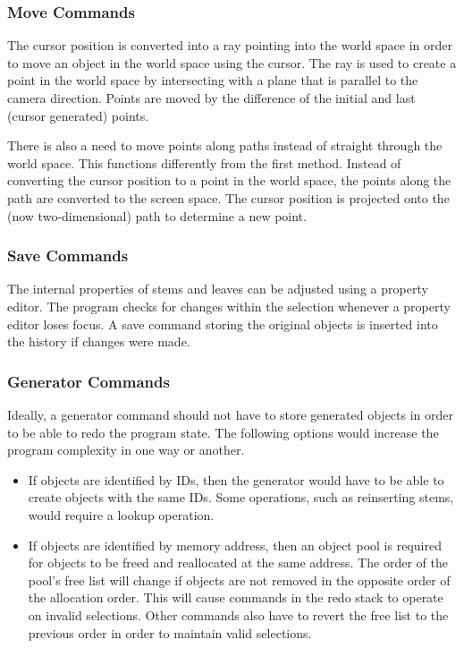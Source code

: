 \documentclass[10pt]{article}
\begin{document}
\subsubsection{Move Commands}

The cursor position is converted into a ray pointing into the world space in order to move an object in the world space using the cursor. The ray is used to create a point in the world space by intersecting with a plane that is parallel to the camera direction. Points are moved by the difference of the initial and last (cursor generated) points.

There is also a need to move points along paths instead of straight through the world space. This functions differently from the first method. Instead of converting the cursor position to a point in the world space, the points along the path are converted to the screen space. The cursor position is projected onto the (now two-dimensional) path to determine a new point.

\subsubsection{Save Commands}

The internal properties of stems and leaves can be adjusted using a property editor. The program checks for changes within the selection whenever a property editor loses focus. A save command storing the original objects is inserted into the history if changes were made.

\subsubsection{Generator Commands}

Ideally, a generator command should not have to store generated objects in order to be able to redo the program state. The following options would increase the program complexity in one way or another.

\begin{itemize}
\item If objects are identified by IDs, then the generator would have to be able to create objects with the same IDs. Some operations, such as reinserting stems, would require a lookup operation.
\item If objects are identified by memory address, then an object pool is required for objects to be freed and reallocated at the same address. The order of the pool's free list will change if objects are not removed in the opposite order of the allocation order. This will cause commands in the redo stack to operate on invalid selections. Other commands also have to revert the free list to the previous order in order to maintain valid selections.
\end{itemize}
\end{document}
